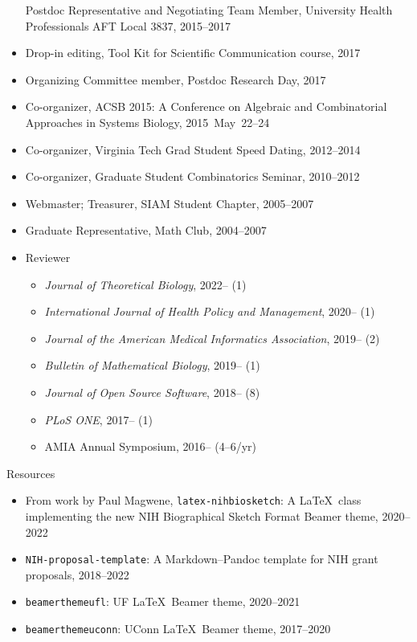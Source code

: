 \documentclass[10pt,a4paper]{article}
\begin{document}
\begin{itemize}[label=$\circ$,nolistsep]
Postdoc Representative and Negotiating Team Member, University Health Professionals AFT Local 3837, 2015--2017
\item
Drop-in editing, Tool Kit for Scientific Communication course, 2017
\item
Organizing Committee member, Postdoc Research Day, 2017
\item
Co-organizer, ACSB 2015: A Conference on Algebraic and Combinatorial Approaches in Systems Biology, 2015~May~22--24
\item
Co-organizer, Virginia Tech Grad Student Speed Dating, 2012--2014
\item
Co-organizer, Graduate Student Combinatorics Seminar, 2010--2012
\item
Webmaster; Treasurer, SIAM Student Chapter, 2005--2007
\item
Graduate Representative, Math Club, 2004--2007
\item
Reviewer
\begin{itemize}[label=$\circ$,nolistsep]
\item
{\itshape Journal of Theoretical Biology}, 2022-- (1)
\item
{\itshape International Journal of Health Policy and Management}, 2020-- (1)
\item
{\itshape Journal of the American Medical Informatics Association}, 2019-- (2)
\item
{\itshape Bulletin of Mathematical Biology}, 2019-- (1)
\item
{\itshape Journal of Open Source Software}, 2018-- (8)
\item
{\itshape PLoS ONE}, 2017-- (1)
\item
AMIA Annual Symposium, 2016-- (4--6/yr)
\end{itemize}
\end{itemize}

\vspace{.25cm}
{\sc Resources}
\begin{itemize}[label=$\circ$,nolistsep]
\item
From work by Paul Magwene, {\tt\small latex-nihbiosketch}: A \LaTeX\ class implementing the new NIH Biographical Sketch Format {\sffamily Beamer} theme, 2020--2022
\item
{\tt\small NIH-proposal-template}: A Markdown--Pandoc template for NIH grant proposals, 2018--2022
\item
{\tt\small beamerthemeufl}: UF \LaTeX\ {\sffamily Beamer} theme, 2020--2021
\item
{\tt\small beamerthemeuconn}: UConn \LaTeX\ {\sffamily Beamer} theme, 2017--2020
\end{itemize}
\end{document}

